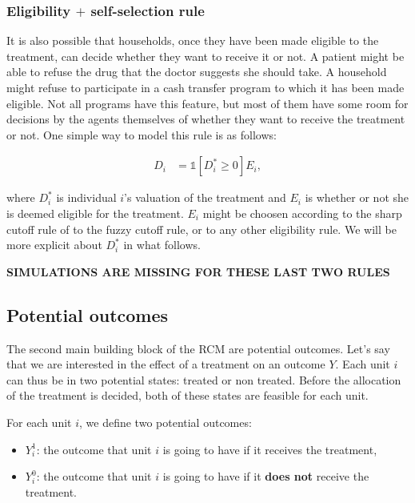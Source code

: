 \documentclass[]{book}
\providecommand{\tightlist}{%
  \setlength{\itemsep}{0pt}\setlength{\parskip}{0pt}}
\newcommand{\uns}[1]{\mathds{1}[ #1 ]}
\theoremstyle{definition}
\theoremstyle{definition}
\theoremstyle{definition}
\theoremstyle{remark}
\let\BeginKnitrBlock\begin \let\EndKnitrBlock\end
\begin{document}
\subsubsection{\texorpdfstring{Eligibility \(+\) self-selection
rule}{Eligibility + self-selection rule}}\label{eligibility-self-selection-rule}

It is also possible that households, once they have been made eligible
to the treatment, can decide whether they want to receive it or not. A
patient might be able to refuse the drug that the doctor suggests she
should take. A household might refuse to participate in a cash transfer
program to which it has been made eligible. Not all programs have this
feature, but most of them have some room for decisions by the agents
themselves of whether they want to receive the treatment or not. One
simple way to model this rule is as follows:

\begin{align}\label{eq:eligself}
  D_i & = \uns{D^*_i\geq0}E_i,
\end{align}

where \(D^*_i\) is individual \(i\)'s valuation of the treatment and
\(E_i\) is whether or not she is deemed eligible for the treatment.
\(E_i\) might be choosen according to the sharp cutoff rule of to the
fuzzy cutoff rule, or to any other eligibility rule. We will be more
explicit about \(D_i^*\) in what follows.

\textbf{SIMULATIONS ARE MISSING FOR THESE LAST TWO RULES}

\subsection{Potential outcomes}\label{potential-outcomes}

The second main building block of the RCM are potential outcomes. Let's
say that we are interested in the effect of a treatment on an outcome
\(Y\). Each unit \(i\) can thus be in two potential states: treated or
non treated. Before the allocation of the treatment is decided, both of
these states are feasible for each unit.

\BeginKnitrBlock{definition}[Potential outcomes]
\protect\hypertarget{def:unnamed-chunk-2}{}{\label{def:unnamed-chunk-2}
\iffalse (Potential outcomes) \fi{} }For each unit \(i\), we define two
potential outcomes:
\EndKnitrBlock{definition}

\begin{itemize}
\tightlist
\item
  \(Y_i^1\): the outcome that unit \(i\) is going to have if it receives
  the treatment,
\item
  \(Y_i^0\): the outcome that unit \(i\) is going to have if it
  \textbf{does not} receive the treatment.
\end{itemize}
\end{document}
